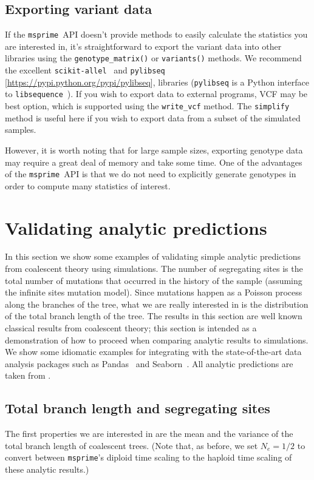 \documentclass[graybox]{svmult}
\newcommand{\msprime}[0]{\texttt{msprime}}
\begin{document}
\subsection{Exporting variant data}\label{exporting-variant-data}

If the \msprime\ API doesn't provide methods to easily calculate the
statistics you are interested in, it's straightforward to export the
variant data into other libraries using the \texttt{genotype\_matrix()}
or \texttt{variants()} methods. We recommend the excellent
\texttt{scikit-allel}~\citep{miles2017scikit} and
\texttt{pylibseq} [\url{https://pypi.python.org/pypi/pylibseq}],
libraries (\texttt{pylibseq} is a Python interface to
\texttt{libsequence}~\citep{thornton2003libsequence}). If you wish to export data to
external programs, VCF may be best option, which is supported using the
\texttt{write\_vcf} method. The \texttt{simplify} method is useful here
if you wish to export data from a subset of the simulated samples.

However, it is worth noting that for large sample sizes, exporting
genotype data may require a great deal of memory and take some time. One
of the advantages of the \msprime\ API is that we do not need to
explicitly generate genotypes in order to compute many
statistics of interest.

\section{Validating analytic predictions}\label{validating-analytical-predictions}

In this section we show some examples of validating simple analytic
predictions from coalescent theory using simulations. The number of
segregating sites is the total number of mutations that occurred in the
history of the sample (assuming the infinite sites mutation model).
Since mutations happen as a Poisson process along the branches of the
tree, what we are really interested in is the distribution of the total
branch length of the tree. The results in this section are well known
classical results from coalescent theory; this section is intended as a
demonstration of how to proceed when comparing analytic results to
simulations. We show some idiomatic examples for integrating with
the state-of-the-art data analysis packages such
as Pandas~\citep{mckinney2010data} and Seaborn~\citep{michael_waskom_2017_883859}.
All analytic predictions are taken from \cite{wakely2008coalescent}.

\subsection{Total branch length and segregating sites}
The first properties we are interested in are the mean and the
variance of the total branch length of coalescent trees. (Note that, as
before, we set \(N_e=1/2\) to convert between \msprime's diploid time
scaling to the haploid time scaling of these analytic results.)
\end{document}
